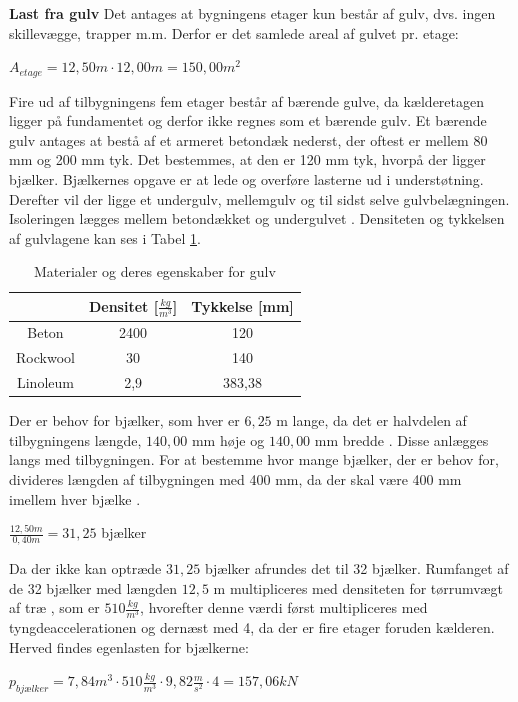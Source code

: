 \textbf{Last fra gulv}
\newline
Det antages at bygningens etager kun består af gulv, dvs. ingen skillevægge, trapper m.m. Derfor er det samlede areal af gulvet pr. etage: 

\begin{center}
$A_{etage} = 12,\!50 m\cdot 12,\!00 m = 150,\!00 m^2$
\end{center}

Fire ud af tilbygningens fem etager består af bærende gulve, da kælderetagen ligger på fundamentet og derfor ikke regnes som et bærende gulv. 
\newline \indent{     }  Et bærende gulv antages at bestå af et armeret betondæk nederst, der oftest er mellem 80 mm og 200 mm tyk. Det bestemmes, at den er 120 mm tyk, hvorpå der ligger bjælker. Bjælkernes opgave er at lede og overføre lasterne ud i understøtning. Derefter vil der ligge et undergulv, mellemgulv og til sidst selve gulvbelægningen. Isoleringen lægges mellem betondækket og undergulvet \citep{Gulvopbygning}. Densiteten og tykkelsen af gulvlagene kan ses i Tabel \ref{tab:densi}.

\begin{table}
	\begin{center}
		\begin{tabular}{|c|c|c|}
			\hline
			& Densitet [$\frac{kg}{m^3}$] & Tykkelse [mm] \\ \hline
			Beton    & 2400     & 120      \\ \hline
			Rockwool & 30       & 140      \\ \hline
			Linoleum & 2,9      & 383,38  \\ \hline
		\end{tabular}
		\caption{Materialer og deres egenskaber for gulv}
		\label{tab:densi}
	\end{center}
\end{table}

Der er behov for bjælker, som hver er $6,\!25$ m lange, da det er halvdelen af tilbygningens længde, $140,\!00$ mm høje og $140,\!00$ mm bredde \citep{granse}. Disse anlægges langs med tilbygningen. For at bestemme hvor mange bjælker, der er behov for, divideres længden af tilbygningen med 400 mm, da der skal være 400 mm imellem hver bjælke \citep{Gulvopbygning}. 

\begin{center}
	$\frac{12,\!50 m}{0,\!40 m}=31,\!25$ bjælker
\end{center} 

Da der ikke kan optræde $31,\!25$ bjælker afrundes det til 32 bjælker.
\newline
\newline
Rumfanget af de 32 bjælker med længden $12,\!5$ m multipliceres med densiteten for tørrumvægt af træ \citep{torrumvagt}, som er $510 \frac{kg}{m^3}$, hvorefter denne værdi først multipliceres med tyngdeaccelerationen og dernæst med 4, da der er fire etager foruden kælderen. Herved findes egenlasten for bjælkerne: 
\begin{center}
	$p_{bjælker} = 7,\!84 m^3\cdot 510 \frac{kg}{m^3}\cdot 9,\!82 \frac{m}{s^2}\cdot 4 = 157,\!06 kN$
\end{center}

